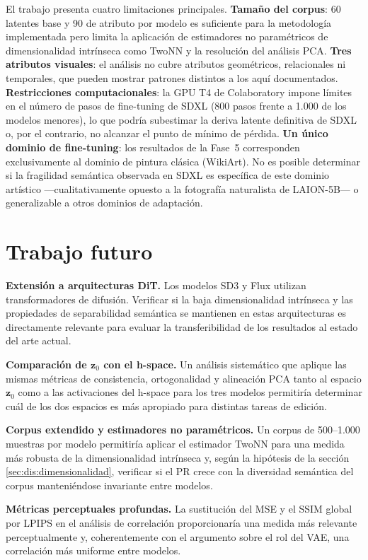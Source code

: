 \documentclass[12pt, a4paper, twoside]{book}
\newcommand{\z}{\mathbf{z}}
\begin{document}
El trabajo presenta cuatro limitaciones principales. \textbf{Tamaño del corpus}: 60 latentes base y 90 de atributo por modelo es suficiente para la metodología implementada pero limita la aplicación de estimadores no paramétricos de dimensionalidad intrínseca como TwoNN y la resolución del análisis PCA. \textbf{Tres atributos visuales}: el análisis no cubre atributos geométricos, relacionales ni temporales, que pueden mostrar patrones distintos a los aquí documentados. \textbf{Restricciones computacionales}: la GPU T4 de Colaboratory impone límites en el número de pasos de fine-tuning de SDXL (800 pasos frente a 1.000 de los modelos menores), lo que podría subestimar la deriva latente definitiva de SDXL o, por el contrario, no alcanzar el punto de mínimo de pérdida. \textbf{Un único dominio de fine-tuning}: los resultados de la Fase~5 corresponden exclusivamente al dominio de pintura clásica (WikiArt). No es posible determinar si la fragilidad semántica observada en SDXL es específica de este dominio artístico ---cualitativamente opuesto a la fotografía naturalista de LAION-5B--- o generalizable a otros dominios de adaptación.

\section{Trabajo futuro}
\label{sec:concl:futuro}

\textbf{Extensión a arquitecturas DiT.} Los modelos SD3 y Flux utilizan transformadores de difusión. Verificar si la baja dimensionalidad intrínseca y las propiedades de separabilidad semántica se mantienen en estas arquitecturas es directamente relevante para evaluar la transferibilidad de los resultados al estado del arte actual.

\textbf{Comparación de $\z_0$ con el h-space.} Un análisis sistemático que aplique las mismas métricas de consistencia, ortogonalidad y alineación PCA tanto al espacio $\z_0$ como a las activaciones del h-space para los tres modelos permitiría determinar cuál de los dos espacios es más apropiado para distintas tareas de edición.

\textbf{Corpus extendido y estimadores no paramétricos.} Un corpus de 500--1.000 muestras por modelo permitiría aplicar el estimador TwoNN para una medida más robusta de la dimensionalidad intrínseca y, según la hipótesis de la sección \ref{sec:dis:dimensionalidad}, verificar si el PR crece con la diversidad semántica del corpus manteniéndose invariante entre modelos.

\textbf{Métricas perceptuales profundas.} La sustitución del MSE y el SSIM global por LPIPS en el análisis de correlación proporcionaría una medida más relevante perceptualmente y, coherentemente con el argumento sobre el rol del VAE, una correlación más uniforme entre modelos.
\end{document}

